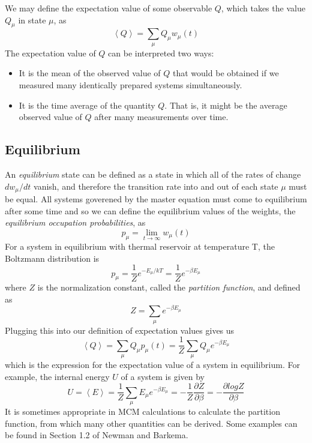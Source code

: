 \documentclass{article}
\begin{document}
We may define the expectation value of some observable $Q$, which
takes the value $Q_{\mu}$ in state $\mu$, as
$$ \left \langle Q \right \rangle = \sum_{\mu} Q_{\mu}w_{\mu}(t) $$
The expectation value of $Q$ can be interpreted two ways:
\begin{itemize}
\item It is the mean of the observed value of $Q$ that would be
obtained if we measured many identically prepared systems simultaneously.
\item It is the time average of the quantity $Q$. That is, it might be the
average observed value of $Q$ after many measurements over time.
\end{itemize}

\subsection{Equilibrium}
An \emph{equilibrium} state can be defined as a state in which all of the
rates of change $dw_{\mu}/dt$ vanish, and therefore the transition rate
into and out of each state $\mu$ must be equal. All systems goverened
by the master equation must come to equilibrium after some time and so
we can define the equilibrium values of the weights, the
\emph{equilibrium occupation probabilities}, as
$$p_{\mu} = \lim_{t\rightarrow \infty} w_{\mu}(t)$$
For a system in equilibrium with thermal reservoir at temperature T, the
Boltzmann distribution is
$$p_{\mu} = \frac{1}{Z}e^{-E_{\mu}/kT} = \frac{1}{Z}e^{-\beta E_{\mu}}$$
where $Z$ is the normalization constant, called the \emph{partition function}, and
defined as
$$Z = \sum_{\mu}e^{-\beta E_{\mu}}$$
Plugging this into our definition of expectation values gives us
$$ \left \langle Q \right \rangle = \sum_{\mu} Q_{\mu}p_{\mu}(t)
                                  = \frac{1}{Z}\sum_{\mu} Q_{\mu}e^{-\beta E_{\mu}} $$
which is the expression for the expectation value of a system in equilibrium.
For example, the internal energy $U$ of a system is given by
$$U = \left \langle E \right \rangle
                                  = \frac{1}{Z}\sum_{\mu} E_{\mu}e^{-\beta E_{\mu}}
                                  = -\frac{1}{Z}\frac{\partial Z}{\partial \beta}
                                  = -\frac{\partial log Z}{\partial \beta}$$
It is sometimes appropriate in MCM calculations to calculate the partition function, from which
many other quantities can be derived. Some examples can be found in Section 1.2 of Newman and
Barkema.
\end{document}
